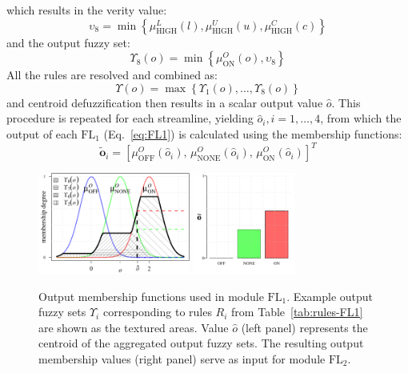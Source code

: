 which results in the verity value:
\begin{equation}
\upsilon_{8} = \min\left\{\mu_{\textrm{HIGH}}^{L}(l), \mu_{\textrm{HIGH}}^{U}(u), \mu_{\textrm{HIGH}}^{C}(c)\right\}
\end{equation}
and the output fuzzy set: 
\begin{equation}
\Upsilon_{8}(o) = \min\left\{\mu_{\textrm{ON}}^{O}(o),\upsilon_{8}\right\}
\end{equation}
All the rules are resolved and combined as:
\begin{equation}
\Upsilon(o) = \max\left\{\Upsilon_{1}(o),\dots,\Upsilon_{8}(o)\right\}
\end{equation}
and centroid defuzzification then results in a scalar output value $\hat{o}$. This procedure is repeated for each streamline, yielding $\hat{o}_{i}, i=1,\dots,4$, from which the output of each $\mathrm{FL}_{1}$ (Eq.~\ref{eq:FL1}) is calculated using the membership functions:
\begin{equation}
\tilde{\mathbf{o}}_{i} = \left[\mu_{\textrm{OFF}}^{O}(\hat{o}_{i}),\, \mu_{\textrm{NONE}}^{O}(\hat{o}_{i}),\, \mu_{\textrm{ON}}^{O}(\hat{o}_{i})\right]^{T}
\end{equation}

\begin{figure}
	\centering
	\includegraphics[height=9em]{fig9a}
	\includegraphics[height=9em]{fig9b}
	\caption{Output membership functions used in module $\mathrm{FL}_{1}$. Example output fuzzy sets $\Upsilon_{\!i}$ corresponding to rules $R_i$ from Table~\ref{tab:rules-FL1} are shown as the textured areas. Value $\hat{o}$ (left panel) represents the centroid of the aggregated output fuzzy sets. The resulting output membership values (right panel) serve as input for module $\mathrm{FL}_{2}$.}
	\label{fig9}
\end{figure}

